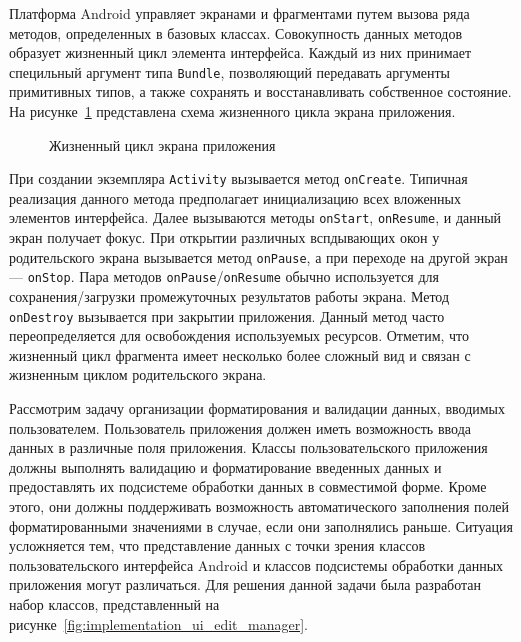 Платформа Android управляет экранами и фрагментами путем вызова ряда методов,
определенных в базовых классах. Совокупность данных методов образует
жизненный цикл элемента интерфейса. Каждый из них принимает
специльный аргумент типа \texttt{Bundle}, позволяющий передавать
аргументы примитивных типов, а также сохранять и восстанавливать
собственное состояние.
На рисунке~\ref{fig:implementation_ui_lifecycle_activity}
представлена схема жизненного цикла экрана приложения.

\begin{figure}[h!]
  \centering
  \caption{Жизненный цикл экрана приложения}
  \label{fig:implementation_ui_lifecycle_activity}
\end{figure}

При создании экземпляра \texttt{Activity} вызывается метод \texttt{onCreate}.
Типичная реализация данного метода предполагает инициализацию
всех вложенных элементов интерфейса.
Далее вызываются методы \texttt{onStart}, \texttt{onResume},
и данный экран получает фокус.
При открытии различных вспдывающих окон у родительского экрана вызывается
метод \texttt{onPause}, а при переходе на другой экран --- \texttt{onStop}.
Пара методов \texttt{onPause}/\texttt{onResume} обычно используется для
сохранения/загрузки промежуточных результатов работы экрана.
Метод \texttt{onDestroy} вызывается при закрытии приложения.
Данный метод часто переопределяется для освобождения используемых ресурсов.
Отметим, что жизненный цикл фрагмента имеет несколько более сложный вид
и связан с жизненным циклом родительского экрана.

Рассмотрим задачу организации форматирования и валидации данных,
вводимых пользователем.
Пользователь приложения должен иметь возможность ввода данных в
различные поля приложения.
Классы пользовательского приложения должны выполнять валидацию и форматирование
введенных данных и предоставлять их подсистеме обработки данных в совместимой форме.
Кроме этого, они должны поддерживать возможность автоматического
заполнения полей форматированными значениями в случае, если они заполнялись раньше.
Ситуация усложняется тем, что представление данных с точки зрения классов
пользовательского интерфейса Android и классов подсистемы обработки данных
приложения могут различаться.
Для решения данной задачи была разработан набор классов, представленный
на рисунке~\ref{fig:implementation_ui_edit_manager}.

